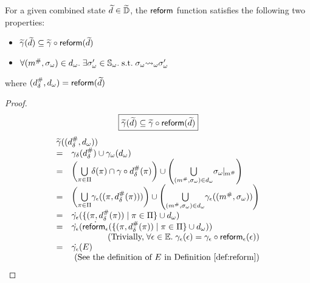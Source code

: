 \begin{lemma}\label{lemma:reform}
  For a given combined state $\widetilde{d} \in \widetilde{\mathbb{D}}$, the $\textsf{reform}$ function
  satisfies the following two properties:
  \begin{itemize}
    \item $\widetilde{\gamma}(\widetilde{d}) \subseteq \widetilde{\gamma} \circ \textsf{reform}(\widetilde{d})$
    \item $\forall ({m}^{\#}, {\sigma}_\omega) \in {{d}_\omega}. \; \exists {\sigma}_\omega' \in
      {\mathbb{S}}_\omega.  \; \text{s.t.} \; {\sigma}_\omega {\leadsto}_\omega {\sigma}_\omega'$
  \end{itemize}
  where $({{d}^{\#}_\delta}, {{d}_\omega}) = \textsf{reform}(\widetilde{d})$
\end{lemma}
\begin{proof}
  \[
    \fbox{$\widetilde{\gamma}(\widetilde{d}) \subseteq \widetilde{\gamma} \circ \textsf{reform}(\widetilde{d})$}
  \]
  \[
    \begin{array}{cl}
      \multicolumn{2}{l}{\combgamma((\sabselem, \symbelem))}\\
      =& \sgamma(\sabselem) \cup \symbgamma(\symbelem)\\

      =& \left( \underset{\view \in \viewset}{\bigcup} {\viewmap(\view) \cap
      \gamma \circ \sabselem(\view)} \right) \cup \left( \underset{(\absimap,
      \symbst) \in \symbelem}{\bigcup} \instant{\symbst}{\absimap} \right) \\

      =& \left( \underset{\view \in \viewset}{\bigcup} \aelemgamma((\view,
      \sabselem(\view))) \right) \cup \left( \underset{(\absimap, \symbst) \in
      \symbelem}{\bigcup} \aelemgamma((\absimap, \symbst)) \right) \\

      =& \dot\aelemgamma(\{ (\view, \sabselem(\view)) \mid \view \in \viewset \}
      \cup \symbelem)\\

      =& \dot\aelemgamma(\dot{\areform}(\{ (\view, \sabselem(\view)) \mid \view
      \in \viewset \} \cup \symbelem))\\

       & \multicolumn{1}{r}{(\text{Trivially,} \; \forall \aelem \in \aelemset.
       \; \aelemgamma(\aelem) = \aelemgamma \circ \areform(\aelem))}\\

      =& \dot\aelemgamma(E)\\
       & \multicolumn{1}{r}{(\text{See the definition of $E$ in
       Definition~\ref{def:reform}})}\\


\end{array}\]
\end{proof}
